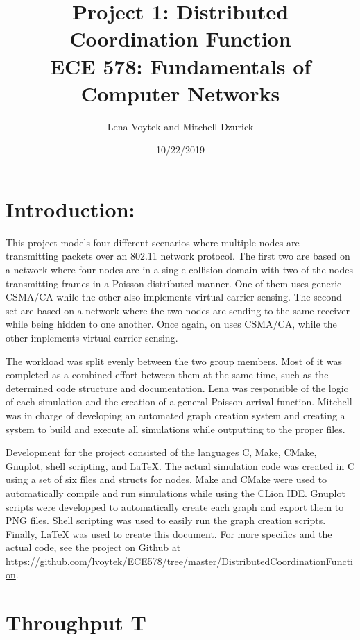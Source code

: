 \documentclass[12pt]{article}
\title {{\bf Project 1: Distributed Coordination Function} \\
\large{ECE 578: Fundamentals of Computer Networks}}
\author{Lena Voytek and Mitchell Dzurick}
\date{10/22/2019}
\begin{document}
\maketitle{}

\section*{Introduction:}

    This project models four different scenarios where multiple nodes are transmitting packets over an 802.11 network protocol. The first two are based on a network where four nodes are in a single collision domain with two of the nodes transmitting frames in a Poisson-distributed manner. One of them uses generic CSMA/CA while the other also implements virtual carrier sensing. The second set are based on a network where the two nodes are sending to the same receiver while being hidden to one another. Once again, on uses CSMA/CA, while the other implements virtual carrier sensing.
    \par
    The workload was split evenly between the two group members. Most of it was completed as a combined effort between them at the same time, such as the determined code structure and documentation. Lena was responsible of the logic of each simulation and the creation of a general Poisson arrival function. Mitchell was in charge of developing an automated graph creation system and creating a system to build and execute all simulations while outputting to the proper files.
    \par
    Development for the project consisted of the languages C, Make, CMake, Gnuplot, shell scripting, and \LaTeX{}. The actual simulation code was created in C using a set of six files and structs for nodes. Make and CMake were used to automatically compile and run simulations while using the CLion IDE. Gnuplot scripts were developped to automatically create each graph and export them to PNG files. Shell scripting was used to easily run the graph creation scripts. Finally, \LaTeX{} was used to create this document. For more specifics and the actual code, see the project on Github at \\
    \textcolor{blue}{ \href{https://github.com/lvoytek/ECE578/tree/master/DistributedCoordinationFunction}{https://github.com/lvoytek/ECE578/tree/master/DistributedCoordinationFunction}}.

\clearpage

\section{Throughput T}
\end{document}
